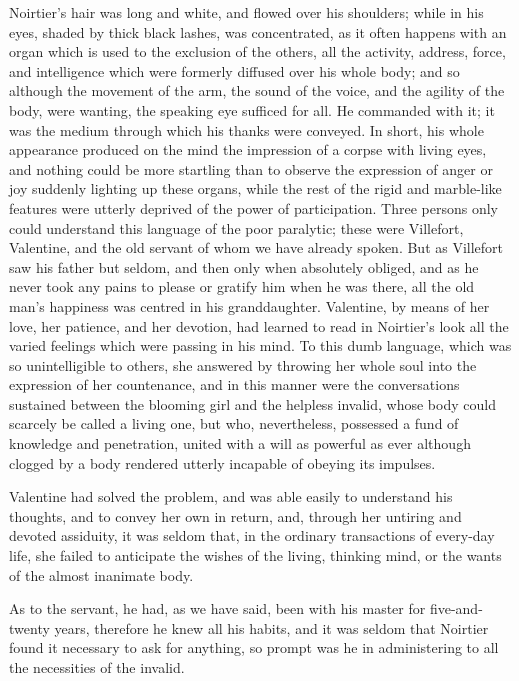  Noirtier's hair was long and white, and flowed over his shoulders; while in his eyes, shaded by thick black lashes, was concentrated, as it often happens with an organ which is used to the exclusion of the others, all the activity, address, force, and intelligence which were formerly diffused over his whole body; and so although the movement of the arm, the sound of the voice, and the agility of the body, were wanting, the speaking eye sufficed for all. He commanded with it; it was the medium through which his thanks were conveyed. In short, his whole appearance produced on the mind the impression of a corpse with living eyes, and nothing could be more startling than to observe the expression of anger or joy suddenly lighting up these organs, while the rest of the rigid and marble-like features were utterly deprived of the power of participation. Three persons only could understand this language of the poor paralytic; these were Villefort, Valentine, and the old servant of whom we have already spoken. But as Villefort saw his father but seldom, and then only when absolutely obliged, and as he never took any pains to please or gratify him when he was there, all the old man's happiness was centred in his granddaughter. Valentine, by means of her love, her patience, and her devotion, had learned to read in Noirtier's look all the varied feelings which were passing in his mind. To this dumb language, which was so unintelligible to others, she answered by throwing her whole soul into the expression of her countenance, and in this manner were the conversations sustained between the blooming girl and the helpless invalid, whose body could scarcely be called a living one, but who, nevertheless, possessed a fund of knowledge and penetration, united with a will as powerful as ever although clogged by a body rendered utterly incapable of obeying its impulses. 

 Valentine had solved the problem, and was able easily to understand his thoughts, and to convey her own in return, and, through her untiring and devoted assiduity, it was seldom that, in the ordinary transactions of every-day life, she failed to anticipate the wishes of the living, thinking mind, or the wants of the almost inanimate body. 

 As to the servant, he had, as we have said, been with his master for five-and-twenty years, therefore he knew all his habits, and it was seldom that Noirtier found it necessary to ask for anything, so prompt was he in administering to all the necessities of the invalid. 

